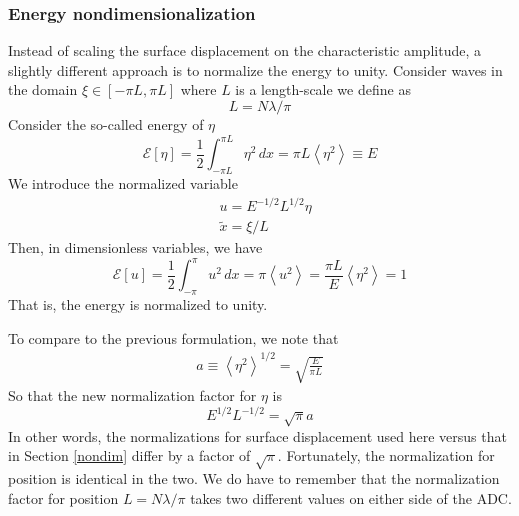 \documentclass[11pt]{article}
\newcommand{\mean}[1]{\left< #1 \right>}
\newcommand{\dx}{\, dx}
\newcommand{\amp}{a}
\newcommand{\lam}{\lambda}
\newcommand{\lamfac}{N}
\newcommand{\En}{\mathcal{E}}
\begin{document}
\subsubsection{Energy nondimensionalization}

Instead of scaling the surface displacement on the characteristic amplitude, a slightly different approach is to normalize the energy to unity. Consider waves in the domain $\xi \in [-\pi L, \pi L]$ where $L$ is a length-scale we define as
\begin{equation}
L = \lamfac \lam / \pi
\end{equation}
Consider the so-called energy of $\eta$
\begin{equation}
\En [\eta] = \frac{1}{2} \int_{-\pi L}^{\pi L} \eta^2 \dx = \pi L \mean{\eta^2} \equiv E
\end{equation}
We introduce the normalized variable
\begin{align}
&u = E^{-1/2}L^{1/2} \eta \\
&\tilde{x} = \xi/L
\end{align}
Then, in dimensionless variables, we have
\begin{equation}
\En [u] = \frac{1}{2} \int_{-\pi}^{\pi} u^2 \dx = \pi \mean{u^2} = \frac{\pi L}{E} \mean{\eta^2} = 1
\end{equation}
That is, the energy is normalized to unity.

To compare to the previous formulation, we note that
\begin{align}
\amp \equiv \mean{\eta^2}^{1/2} = \sqrt{ \frac{E}{\pi L} }
\end{align}
So that the new normalization factor for $\eta$ is
\begin{equation}
E^{1/2}L^{-1/2} = \sqrt{\pi} \amp
\end{equation}
In other words, the normalizations for surface displacement used here versus that in Section \ref{nondim}
 differ by a factor of $\sqrt{\pi}$. Fortunately, the normalization for position is identical in the two. We do have to remember that the normalization factor for position $L = \lamfac \lam / \pi$ takes two different values on either side of the ADC.
\end{document}
